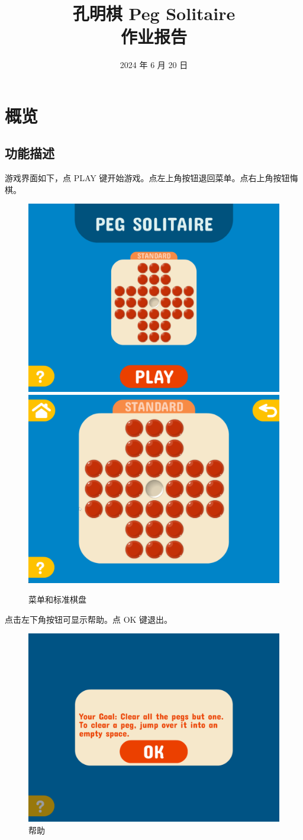 \documentclass[12pt,a4paper,twoside]{ctexart}
\title{{\bf\Huge 孔明棋 Peg Solitaire}\\ \normalsize 作业报告}
\date{2024 年 6 月 20 日}
\numberwithin{figure}{section}
\numberwithin{equation}{section}
\begin{document}
\maketitle
\setcounter{page}{0}
\thispagestyle{empty}

\newpage

\tableofcontents%


\newpage
{}

\section{概览}
\subsection{功能描述}
游戏界面如下，点 PLAY 键开始游戏。点左上角按钮退回菜单。点右上角按钮悔棋。
\begin{figure}[ht]
    \centering
    \includegraphics[width=.45\textwidth]{background.png}
    \quad
    \includegraphics[width=.45\textwidth]{standard.png}
    \caption{菜单和标准棋盘}
\end{figure}

点击左下角按钮可显示帮助。点 OK 键退出。
\begin{figure}[ht]
    \centering
    \includegraphics[width=.45\textwidth]{help.png}
    \caption{帮助}
\end{figure}
\end{document}
